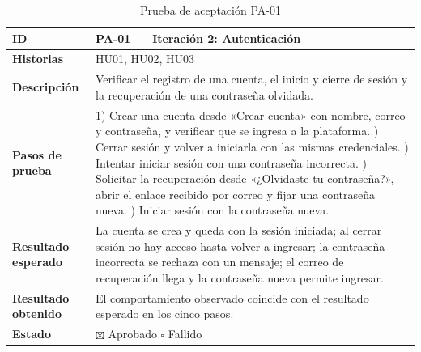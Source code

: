 \documentclass[12pt,letterpaper,oneside]{report}
\begin{document}
\begin{table}[H]
  \centering
  \caption{Prueba de aceptación PA-01}
  \label{tab:pa01anexo}
  \renewcommand{\arraystretch}{1.3}
  \small
  \begin{tabular}{|>{\raggedright\arraybackslash}p{3.6cm}|p{9.4cm}|}
    \hline
    \textbf{ID} & PA-01 — Iteración 2: Autenticación \\ \hline
    \textbf{Historias} & HU01, HU02, HU03 \\ \hline
    \textbf{Descripción} & Verificar el registro de una cuenta, el inicio y cierre de sesión y la recuperación de una contraseña olvidada. \\ \hline
    \textbf{Pasos de prueba} &
      1) Crear una cuenta desde «Crear cuenta» con nombre, correo y contraseña, y verificar que se ingresa a la plataforma. \newline
      2) Cerrar sesión y volver a iniciarla con las mismas credenciales. \newline
      3) Intentar iniciar sesión con una contraseña incorrecta. \newline
      4) Solicitar la recuperación desde «¿Olvidaste tu contraseña?», abrir el enlace recibido por correo y fijar una contraseña nueva. \newline
      5) Iniciar sesión con la contraseña nueva. \\ \hline
    \textbf{Resultado esperado} & La cuenta se crea y queda con la sesión iniciada; al cerrar sesión no hay acceso hasta volver a ingresar; la contraseña incorrecta se rechaza con un mensaje; el correo de recuperación llega y la contraseña nueva permite ingresar. \\ \hline
    \textbf{Resultado obtenido} & El comportamiento observado coincide con el resultado esperado en los cinco pasos. \\ \hline
    \textbf{Estado} & $\boxtimes$ Aprobado \qquad $\square$ Fallido \\ \hline
  \end{tabular}
\end{table}
\end{document}
